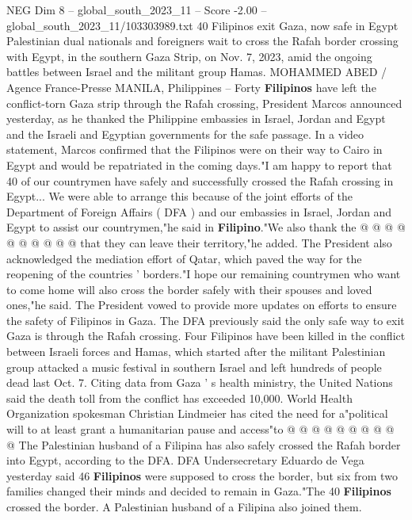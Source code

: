 \begin{textsample}{NEG Dim 8 – global\_south\_2023\_11 – Score -2.00 – global\_south\_2023\_11/103303989.txt}  \label{ex:f8_neg_078}
40 Filipinos exit Gaza, now safe in Egypt Palestinian dual nationals and foreigners wait to cross the Rafah border crossing with Egypt, in the southern Gaza Strip, on Nov. 7, 2023, amid the ongoing battles between Israel and the militant group Hamas.
MOHAMMED ABED / Agence France-Presse MANILA, Philippines -- Forty \textbf{Filipinos} have left the conflict-torn Gaza strip through the Rafah crossing, President Marcos announced yesterday, as he thanked the Philippine embassies in Israel, Jordan and Egypt and the Israeli and Egyptian governments for the safe passage.
In a video statement, Marcos confirmed that the Filipinos were on their way to Cairo in Egypt and would be repatriated in the coming days."I am happy to report that 40 of our countrymen have safely and successfully crossed the Rafah crossing in Egypt...
We were able to arrange this because of the joint efforts of the Department of Foreign Affairs ( DFA ) and our embassies in Israel, Jordan and Egypt to assist our countrymen,"he said in \textbf{Filipino}."We also thank the @ @ @ @ @ @ @ @ @ @ that they can leave their territory,"he added.
The President also acknowledged the mediation effort of Qatar, which paved the way for the reopening of the countries ' borders."I hope our remaining countrymen who want to come home will also cross the border safely with their spouses and loved ones,"he said.
The President vowed to provide more updates on efforts to ensure the safety of Filipinos in Gaza.
The DFA previously said the only safe way to exit Gaza is through the Rafah crossing.
Four Filipinos have been killed in the conflict between Israeli forces and Hamas, which started after the militant Palestinian group attacked a music festival in southern Israel and left hundreds of people dead last Oct. 7.
Citing data from Gaza ' s health ministry, the United Nations said the death toll from the conflict has exceeded 10,000.
World Health Organization spokesman Christian Lindmeier has cited the need for a"political will to at least grant a humanitarian pause and access"to @ @ @ @ @ @ @ @ @ @ The Palestinian husband of a Filipina has also safely crossed the Rafah border into Egypt, according to the DFA.
DFA Undersecretary Eduardo de Vega yesterday said 46 \textbf{Filipinos} were supposed to cross the border, but six from two families changed their minds and decided to remain in Gaza."The 40 \textbf{Filipinos} crossed the border.
A Palestinian husband of a Filipina also joined them.

\end{textsample}
